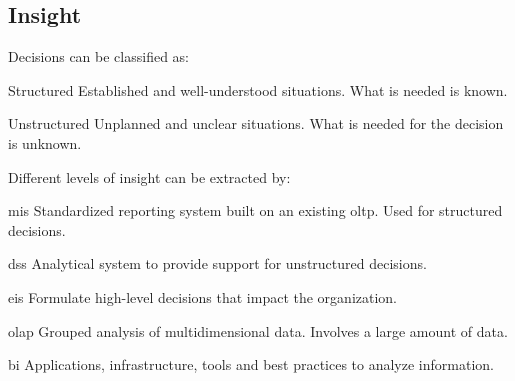 \subsection{Insight}
Decisions can be classified as:
\begin{descriptionlist}
    \item[Structured] 
        Established and well-understood situations.
        What is needed is known.
    \item[Unstructured] 
        Unplanned and unclear situations.
        What is needed for the decision is unknown.
\end{descriptionlist}

Different levels of insight can be extracted by:
\begin{descriptionlist}
    \item[\Ac{mis}] 
        Standardized reporting system built on an existing \ac{oltp}.
        Used for structured decisions.

    \item[\Ac{dss}] 
        Analytical system to provide support for unstructured decisions.

    \item[\Ac{eis}] 
        Formulate high-level decisions that impact the organization.

    \item[\Ac{olap}] 
        Grouped analysis of multidimensional data.
        Involves a large amount of data.

    \item[\Ac{bi}] 
        Applications, infrastructure, tools and best practices to analyze information.
\end{descriptionlist}



